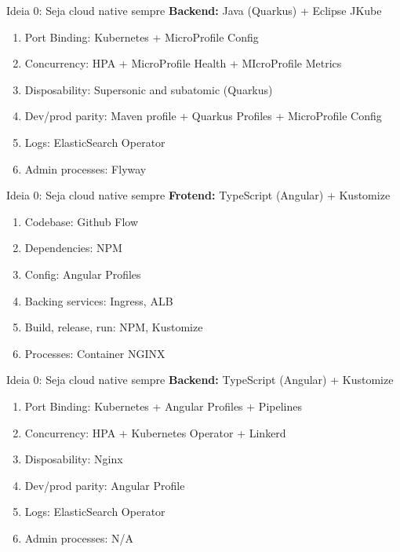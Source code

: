 \documentclass[aspectratio=169]{beamer}
\begin{document}
\begin{frame}{Ideia 0: Seja cloud native sempre}
\textbf{Backend:} Java (Quarkus) + Eclipse JKube
		\begin{enumerate}
			\item Port Binding: Kubernetes + MicroProfile Config
			\item Concurrency: HPA + MicroProfile Health + MIcroProfile Metrics
			\item Disposability: Supersonic and subatomic (Quarkus)
			\item Dev/prod parity: Maven profile + Quarkus Profiles + MicroProfile Config
			\item Logs: ElasticSearch Operator
			\item Admin processes: Flyway
		\end{enumerate}
\end{frame}

\begin{frame}{Ideia 0: Seja cloud native sempre}
\textbf{Frotend:} TypeScript (Angular) + Kustomize
		\begin{enumerate}
			\item Codebase: Github Flow
			\item Dependencies: NPM
			\item Config: Angular Profiles
			\item Backing services: Ingress, ALB
			\item Build, release, run: NPM, Kustomize
			\item Processes: Container NGINX
		\end{enumerate}

\end{frame}

\begin{frame}{Ideia 0: Seja cloud native sempre}
 \textbf{Backend:} TypeScript (Angular) + Kustomize
		\begin{enumerate}
			\item Port Binding: Kubernetes + Angular Profiles + Pipelines
			\item Concurrency: HPA + Kubernetes Operator + Linkerd
			\item Disposability: Nginx
			\item Dev/prod parity: Angular Profile
			\item Logs: ElasticSearch Operator
			\item Admin processes: N/A
		\end{enumerate}
\end{frame}
\end{document}
